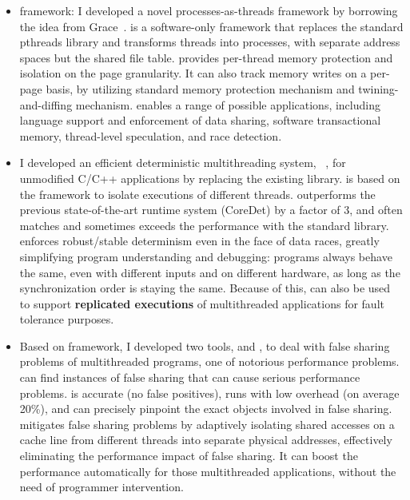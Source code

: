 \begin{itemize}
\item \Sheriff{} framework: I developed a novel processes-as-threads framework by borrowing the idea from Grace~\cite{grace}. \sheriff{} is a software-only framework that replaces the standard pthreads library and transforms
threads into processes, with separate address spaces but the shared file table. \sheriff{} provides per-thread memory protection and isolation on the page granularity. It can also track memory writes on a per-page basis, by utilizing standard memory protection mechanism and  twining-and-diffing mechanism. \sheriff{} enables a range of possible applications, including language support and enforcement of data sharing, software transactional memory, thread-level speculation, and race detection. 

\item I developed an efficient deterministic multithreading system, \dthreads{}~\cite{dthreads}, for unmodified C/C++ applications by replacing the existing \pthreads{} library. \dthreads{} is based on the \sheriff{} framework to isolate executions of different threads. \dthreads{} outperforms the previous state-of-the-art runtime system (CoreDet) by a factor of 3, and often matches and sometimes exceeds the performance with the standard \pthreads{} library. \Dthreads{} enforces robust/stable determinism even in the face of data races, greatly simplifying program understanding and debugging: programs always behave the same, even with different inputs and on different hardware, as long as the synchronization order is staying the same. Because of this, \dthreads{} can also be used to support \textbf{replicated executions} 
of multithreaded applications for fault tolerance purposes.

\item 
Based on \sheriff{} framework, I developed two tools, \SheriffDetect{} and \SheriffProtect{}, to deal with false sharing problems
of multithreaded programs, one of notorious performance problems. 
\SheriffDetect{} can find instances of false sharing that can cause serious performance problems. \SheriffDetect{} is accurate (no false positives), runs with low overhead (on average 20\%), and can precisely pinpoint the exact objects involved in false sharing.
\SheriffProtect{} mitigates false sharing problems by adaptively isolating shared accesses on a cache line from different threads into separate physical addresses, effectively eliminating the performance impact of false sharing. It can boost the performance automatically for those multithreaded applications, without the need of programmer intervention. 


\end{itemize}
